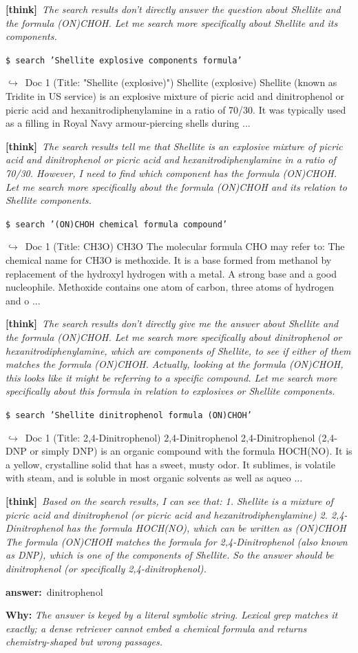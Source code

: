 \documentclass{article} %
\newcommand{\winbadge}{\colorbox{green!50!black}{\textcolor{white}{\scriptsize\bfseries\,WIN\,}}}
\newcommand{\thk}[1]{{\footnotesize\textcolor{violet!75!black}{\textbf{[think]}}\ \textit{#1}\par}}
\newcommand{\cmd}[1]{{\footnotesize\texttt{\textcolor{blue!35!black}{\$\ #1}}\par}}
\newcommand{\retr}[1]{{\footnotesize\textcolor{black!65}{\quad$\hookrightarrow$\ #1}\par}}
\newcommand{\ans}[1]{{\footnotesize\textbf{answer:}\ #1\par}}
\begin{document}
\begin{cmpbox}[label={ex:hotpot-formula},title={\winbadge\ \ \textsc{HotpotQA -- symbolic / rare-token match}}]
  \thk{The search results don't directly answer the question about Shellite and the formula (ON)CHOH. Let me search more specifically about Shellite and its components.}
  \cmd{search 'Shellite explosive components formula'}
  \retr{Doc 1 (Title: "Shellite (explosive)") Shellite (explosive) Shellite (known as Tridite in US service) is an explosive mixture of picric acid and dinitrophenol or picric acid and hexanitrodiphenylamine in a ratio of 70/30. It was typically used as a filling in Royal Navy armour-piercing shells during ...}
  \thk{The search results tell me that Shellite is an explosive mixture of picric acid and dinitrophenol or picric acid and hexanitrodiphenylamine in a ratio of 70/30. However, I need to find which component has the formula (ON)CHOH. Let me search more specifically about the formula (ON)CHOH and its relation to Shellite components.}
  \cmd{search '(ON)CHOH chemical formula compound'}
  \retr{Doc 1 (Title: CH3O) CH3O The molecular formula CHO may refer to: The chemical name for CH3O is methoxide. It is a base formed from methanol by replacement of the hydroxyl hydrogen with a metal. A strong base and a good nucleophile. Methoxide contains one atom of carbon, three atoms of hydrogen and o ...}
  \thk{The search results don't directly give me the answer about Shellite and the formula (ON)CHOH. Let me search more specifically about dinitrophenol or hexanitrodiphenylamine, which are components of Shellite, to see if either of them matches the formula (ON)CHOH. Actually, looking at the formula (ON)CHOH, this looks like it might be referring to a specific compound. Let me search more specifically about this formula in relation to explosives or Shellite components.}
  \cmd{search 'Shellite dinitrophenol formula (ON)CHOH'}
  \retr{Doc 1 (Title: 2,4-Dinitrophenol) 2,4-Dinitrophenol 2,4-Dinitrophenol (2,4-DNP or simply DNP) is an organic compound with the formula HOCH(NO). It is a yellow, crystalline solid that has a sweet, musty odor. It sublimes, is volatile with steam, and is soluble in most organic solvents as well as aqueo ...}
  \thk{Based on the search results, I can see that: 1. Shellite is a mixture of picric acid and dinitrophenol (or picric acid and hexanitrodiphenylamine) 2. 2,4-Dinitrophenol has the formula HOCH(NO), which can be written as (ON)CHOH The formula (ON)CHOH matches the formula for 2,4-Dinitrophenol (also known as DNP), which is one of the components of Shellite. So the answer should be dinitrophenol (or specifically 2,4-dinitrophenol).}
  \ans{dinitrophenol}
\smallskip\par\textbf{Why:} \textit{The answer is keyed by a literal symbolic string. Lexical grep matches it exactly; a dense retriever cannot embed a chemical formula and returns chemistry-shaped but wrong passages.}
\end{cmpbox}\bigskip
\end{document}
